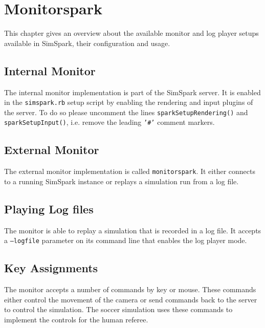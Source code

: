 \chapter{Monitorspark}
\label{cha:monitorspark}

This chapter gives an overview about the available monitor and log
player setups available in SimSpark, their configuration and usage.

\section{Internal Monitor}

The internal monitor implementation is part of the SimSpark server. It
is enabled in the \texttt{simspark.rb} setup script by enabling the
rendering and input plugins of the server. To do so please uncomment
the lines \texttt{sparkSetupRendering()} and
\texttt{sparkSetupInput()}, i.e. remove the leading \texttt{'\#'} comment markers.

\section{External Monitor}

The external monitor implementation is called
\texttt{monitorspark}. It either connects to a running SimSpark
instance or replays a simulation run from a log file.

\section{Playing Log files}

The monitor is able to replay a simulation that is recorded in a log
file. It accepts a \texttt{--logfile} parameter on its command line
that enables the log player mode.

\section{Key Assignments}

The monitor accepts a number of commands by key or mouse. These
commands either control the movement of the camera or send commands
back to the server to control the simulation. The soccer simulation
uses these commands to implement the controls for the human referee.

